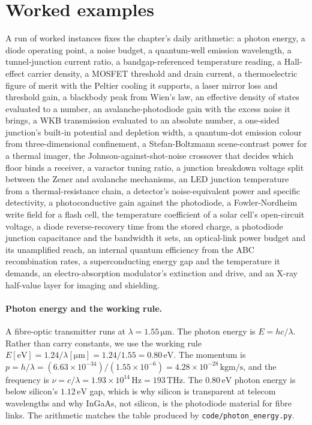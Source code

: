 

\section{Worked examples}

A run of worked instances fixes the chapter's daily arithmetic: a photon
energy, a diode operating point, a noise budget, a quantum-well
emission wavelength, a tunnel-junction current ratio, a
bandgap-referenced temperature reading, a Hall-effect carrier density,
a MOSFET threshold and drain current, a thermoelectric figure of
merit with the Peltier cooling it supports, a laser mirror loss and
threshold gain, a blackbody peak from Wien's law, an effective
density of states evaluated to a number, an avalanche-photodiode
gain with the excess noise it brings, a WKB transmission evaluated to
an absolute number, a one-sided junction's built-in potential and
depletion width, a quantum-dot emission colour from three-dimensional
confinement, a Stefan-Boltzmann scene-contrast power for a thermal
imager, the Johnson-against-shot-noise crossover that decides which
floor binds a receiver, a varactor tuning ratio, a junction breakdown
voltage split between the Zener and avalanche mechanisms, an LED
junction temperature from a thermal-resistance chain, a detector's
noise-equivalent power and specific detectivity, a photoconductive gain
against the photodiode, a Fowler-Nordheim write field for a flash cell,
the temperature coefficient of a solar cell's open-circuit voltage, a diode
reverse-recovery time from the stored charge, a photodiode junction capacitance
and the bandwidth it sets, an optical-link power budget and its unamplified
reach, an internal quantum efficiency from the ABC recombination rates, a
superconducting energy gap and the temperature it demands, an
electro-absorption modulator's extinction and drive, and an X-ray half-value
layer for imaging and shielding.

\paragraph{Photon energy and the working rule.}
A fibre-optic transmitter runs at $\lambda = 1.55\,\si{\micro\meter}$.
The photon energy is $E = hc/\lambda$. Rather than carry constants, we
use the working rule $E[\si{\electronvolt}] = 1.24 / \lambda[\si{
\micro\meter}] = 1.24/1.55 = 0.80\,\si{\electronvolt}$. The momentum is
$p = h/\lambda = (6.63\times 10^{-34})/(1.55\times 10^{-6}) = 4.28\times
10^{-28}\,\si{\kilogram\meter\per\second}$, and the frequency is
$\nu = c/\lambda = 1.93\times 10^{14}\,\si{\hertz} = 193\,\si{\tera
\hertz}$. The $0.80\,\si{\electronvolt}$ photon energy is below
silicon's $1.12\,\si{\electronvolt}$ gap, which is why silicon is
transparent at telecom wavelengths and why InGaAs, not silicon, is the
photodiode material for fibre links. The arithmetic matches the table
produced by \texttt{code/photon\_energy.py}.

